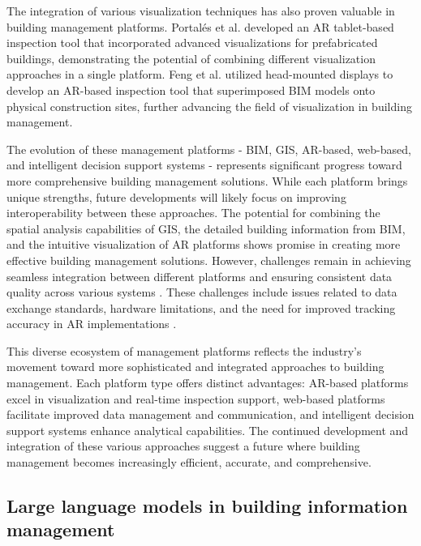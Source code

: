 \documentclass[a4paper,fleqn]{cas-sc}
\begin{document}
The integration of various visualization techniques has also proven valuable in building management platforms. Portalés et al. \cite{portales2018digital} developed an AR tablet-based inspection tool that incorporated advanced visualizations for prefabricated buildings, demonstrating the potential of combining different visualization approaches in a single platform. Feng et al. \cite{feng2020visualization} utilized head-mounted displays to develop an AR-based inspection tool that superimposed BIM models onto physical construction sites, further advancing the field of visualization in building management.

The evolution of these management platforms - BIM, GIS, AR-based, web-based, and intelligent decision support systems - represents significant progress toward more comprehensive building management solutions. While each platform brings unique strengths, future developments will likely focus on improving interoperability between these approaches. The potential for combining the spatial analysis capabilities of GIS, the detailed building information from BIM, and the intuitive visualization of AR platforms shows promise in creating more effective building management solutions. However, challenges remain in achieving seamless integration between different platforms and ensuring consistent data quality across various systems \cite{hola2015identification}. These challenges include issues related to data exchange standards, hardware limitations, and the need for improved tracking accuracy in AR implementations \cite{may2022identification}.

This diverse ecosystem of management platforms reflects the industry's movement toward more sophisticated and integrated approaches to building management. Each platform type offers distinct advantages: AR-based platforms excel in visualization and real-time inspection support, web-based platforms facilitate improved data management and communication, and intelligent decision support systems enhance analytical capabilities. The continued development and integration of these various approaches suggest a future where building management becomes increasingly efficient, accurate, and comprehensive.

\subsection{Large language models in building information management}
\end{document}
